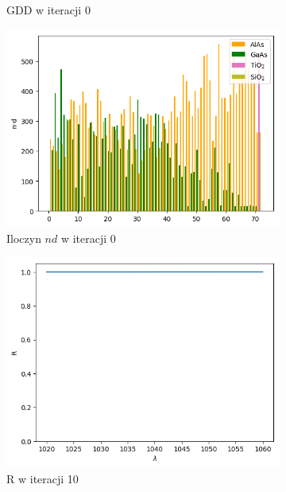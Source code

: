 \begin{figure} [H]
\begin{subfigure}[b]{0.31\textwidth}
        \caption{GDD w iteracji 0}
    \end{subfigure}
            \begin{subfigure}[b]{0.32\textwidth}
        \includegraphics[width=\linewidth]{figures/wyniki/losowe/dbr_opt10/result_ndresult0.png}
        \caption{Iloczyn $nd$ w iteracji 0}
    \end{subfigure}
        \begin{subfigure}[b]{0.30\textwidth}
        \includegraphics[width=\linewidth]{figures/wyniki/losowe/dbr_opt10/result_Rresult10.png}
        \caption{R w iteracji 10}
    \end{subfigure}
        \begin{subfigure}[b]{0.31\textwidth}

\end{subfigure}
\end{figure}
